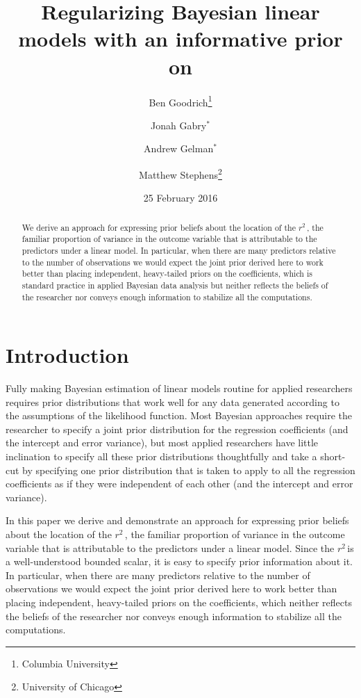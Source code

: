 \documentclass[11pt]{article}
\title{\bf Regularizing Bayesian linear models with an informative prior on \Rsq
    \vspace{.1in}}
\author{Ben Goodrich\footnote{Columbia University}
    \and Jonah Gabry$^{\ast}$
    \and Andrew Gelman$^{\ast}$
    \and Matthew Stephens\footnote{University of Chicago}
    \vspace{.1in}}
\date{25 February 2016
    \vspace{-.2in}}
\newcommand{\Rsq}{$r^2\,$}
\begin{document}
\maketitle
\thispagestyle{empty}

\begin{abstract}
\noindent We derive an approach for expressing prior beliefs about the location
of the \Rsq, the familiar proportion of variance in the outcome variable that is
attributable to the predictors under a linear model. In particular, when there
are many predictors relative to the number of observations we would expect the
joint prior derived here to work better than placing independent, heavy-tailed
priors on the coefficients, which is  standard practice in applied Bayesian data
analysis but neither reflects the beliefs of the researcher nor conveys enough
information to stabilize all the computations.
\end{abstract}


\section{Introduction}

Fully making Bayesian estimation of linear models routine for applied
researchers requires prior distributions that work well for any data generated
according to the assumptions of the likelihood function. Most Bayesian
approaches require the researcher to specify a joint prior distribution for the
regression coefficients (and the intercept and error variance), but most applied
researchers have little inclination to specify all these prior distributions
thoughtfully and take a short-cut by specifying one prior distribution that is
taken to apply to all the regression coefficients as if they were independent of
each other (and the intercept and error variance).

In this paper we derive and demonstrate an approach for expressing  prior
beliefs about the location of the \Rsq, the familiar proportion of variance in
the outcome variable that is attributable to the predictors under a linear
model. Since the \Rsq is a well-understood bounded scalar, it is easy to specify
prior information about it. In particular, when there are many predictors
relative to the number of observations we would expect the joint prior derived
here to work better than placing independent, heavy-tailed priors on the
coefficients, which neither reflects the beliefs of the researcher nor conveys
enough information to stabilize all the computations.
\end{document}
